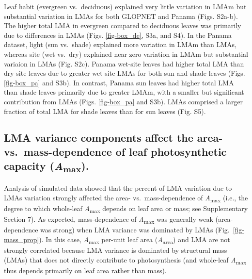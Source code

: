 \documentclass[
  12pt,
  letterpaper,
  DIV=11,
  numbers=noendperiod]{scrartcl}
\begin{document}
Leaf habit (evergreen vs.~deciduous) explained very little variation in
LMAm but substantial variation in LMAs for both GLOPNET and Panama
(Figs. S2a-b). The higher total LMA in evergreen compared to deciduous
leaves was primarily due to differences in LMAs (Figs. \ref{fig-box_de},
S3a, and S4). In the Panama dataset, light (sun vs.~shade) explained
more variation in LMAm than LMAs, whereas site (wet vs.~dry) explained
near zero variation in LMAm but substantial variaion in LMAs (Fig. S2c).
Panama wet-site leaves had higher total LMA than dry-site leaves due to
greater wet-site LMAs for both sun and shade leaves (Figs.
\ref{fig-box_pa} and S3b). In contrast, Panama sun leaves had higher
total LMA than shade leaves primarily due to greater LMAm, with a
smaller but significant contribution from LMAs (Figs. \ref{fig-box_pa}
and S3b). LMAs comprised a larger fraction of total LMA for shade leaves
than for sun leaves (Fig. S5).

\subsection{\texorpdfstring{LMA variance components affect the area-
vs.~mass-dependence of leaf photosynthetic capacity
(\emph{A}\textsubscript{max}).}{LMA variance components affect the area- vs.~mass-dependence of leaf photosynthetic capacity (Amax).}}\label{lma-variance-components-affect-the-area--vs.-mass-dependence-of-leaf-photosynthetic-capacity-amax.}

Analysis of simulated data showed that the percent of LMA variation due
to LMAs variation strongly affected the area- vs.~mass-dependence of
\emph{A}\textsubscript{max} (i.e., the degree to which whole-leaf
\emph{A}\textsubscript{max} depends on leaf area or mass; see
Supplementary Section 7). As expected, mass-dependence of
\emph{A}\textsubscript{max} was generally weak (area-dependence was
strong) when LMA variance was dominated by LMAs
(Fig.~\ref{fig-mass_prop}). In this case, \emph{A}\textsubscript{max}
per-unit leaf area (\emph{A}\textsubscript{area}) and LMA are not
strongly correlated because LMA variance is dominated by structural mass
(LMAs) that does not directly contribute to photosynthesis (and
whole-leaf \emph{A}\textsubscript{max} thus depends primarily on leaf
area rather than mass).
\end{document}
